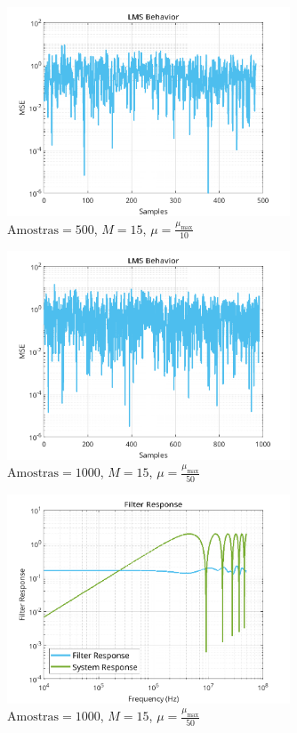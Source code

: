 \documentclass[a4paper,10pt]{article}
\begin{document}
\begin{enumerate}
				\begin{figure}[H]
					\centering
					\includegraphics[width=0.75\textwidth]{figs/L3Q5_mu_10.png}
					\caption{$\text{Amostras} = 500$, $M = 15$, $\mu = \frac{\mu_{\text{max}}}{10}$}
					\label{fig:mu_10}
				\end{figure}

				\begin{figure}[H]
					\centering
					\includegraphics[width=0.75\textwidth]{figs/L3Q5_mu_50.png}
					\caption{$\text{Amostras} = 1000$, $M = 15$, $\mu = \frac{\mu_{\text{max}}}{50}$}
					\label{fig:mu_50}
				\end{figure}

				\begin{figure}[H]
					\centering
					\includegraphics[width=0.75\textwidth]{figs/L3Q5_filter_response.png}
					\caption{$\text{Amostras} = 1000$, $M = 15$, $\mu = \frac{\mu_{\text{max}}}{50}$}
					\label{fig:filter_response}
				\end{figure}


\end{enumerate}
\end{document}
